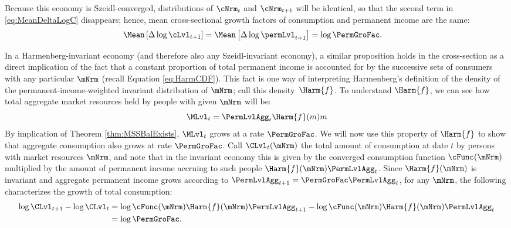 \documentclass[\econtexRoot/BufferStockTheory]{subfiles}
\begin{document}
Because this economy is Szeidl-converged, distributions of $\cNrm_{t}$ and $\cNrm_{t+1}$ will be identical, so that the second term in  \eqref{eq:MeanDeltaLogC} disappears; hence, mean cross-sectional growth factors of consumption and permanent income are the same:
\begin{equation}\begin{gathered}\begin{aligned}
  \Mean\left[\Delta \log \cLvl_{t+1}\right]  & = \Mean\left[ \Delta \log \permLvl_{t+1}\right] = \log \PermGroFac \label{eq:MeanDeltaLogCeqMeanDeltaLogP}.
\end{aligned}\end{gathered}\end{equation}

In a Harmenberg-invariant economy (and therefore also any Szeidl-invariant economy), a similar proposition holds in the cross-section as a direct implication of the fact that a constant proportion of total permanent income is accounted for by the successive sets of consumers with any particular $\mNrm$ (recall Equation \eqref{eq:HarmCDF}).
This fact is one way of interpreting Harmenberg's definition of the density of the permanent-income-weighted invariant distribution of $\mNrm$; call this density~$\Harm{f}$.
To understand $\Harm{f}$, we can see how total aggregate market resources held by people with given $\mNrm$ will be:
%
%
\begin{equation}
\MLvl_{t}=\PermLvlAgg_{t}\Harm{f}(m)m
\end{equation}
%
%
By implication of Theorem \ref{thm:MSSBalExists}, $\MLvl_{t}$ grows at a rate $\PermGroFac$.
We will now use this property of $\Harm{f}$ to show that aggregate consumption also grows at rate $\PermGroFac$.
Call $\CLvl_{t}(\mNrm)$ the total amount of consumption at date $t$ by persons with market resources $\mNrm$, and note that in the invariant economy this is given by the converged consumption function $\cFunc(\mNrm)$ multiplied by the amount of permanent income accruing to such people $\Harm{f}(\mNrm)\PermLvlAgg_{t}$.
Since $\Harm{f}(\mNrm)$ is invariant and aggregate permanent income grows according to $\PermLvlAgg_{t+1} = \PermGroFac \PermLvlAgg_{t}$, for any $\mNrm$, the following characterizes the growth of total consumption:
%
%
\begin{equation*}
  \begin{aligned}
    \log \CLvl_{t+1} - \log \CLvl_{t} &  \notag
    = \log \cFunc(\mNrm) \Harm{f}(\mNrm)\PermLvlAgg_{t+1} - \log \cFunc(\mNrm)\Harm{f}(\mNrm)\PermLvlAgg_{t} \\
    & = \log \PermGroFac.
  \end{aligned}
\end{equation*}
\end{document}
